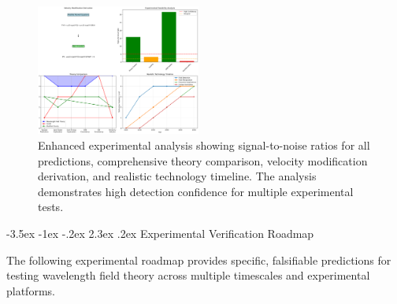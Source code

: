 \documentclass[10pt,twocolumn]{article}
\makeatletter
\renewcommand\section{\@startsection{section}{1}{\z@}%
  {-3.5ex \@plus -1ex \@minus -.2ex}%
  {2.3ex \@plus.2ex}%
  {\normalfont\large\bfseries}}
\makeatother
\begin{document}
\begin{figure}[h]
\centering
\includegraphics[width=0.48\textwidth]{../figures/enhanced_manuscript_analysis.png}
\caption{Enhanced experimental analysis showing signal-to-noise ratios for all predictions, comprehensive theory comparison, velocity modification derivation, and realistic technology timeline. The analysis demonstrates high detection confidence for multiple experimental tests.}
\label{fig:enhanced_analysis}
\end{figure}

\clearpage

\section{Experimental Verification Roadmap}

\vspace{0.5em}
The following experimental roadmap provides specific, falsifiable predictions for testing wavelength field theory across multiple timescales and experimental platforms.
\end{document}
